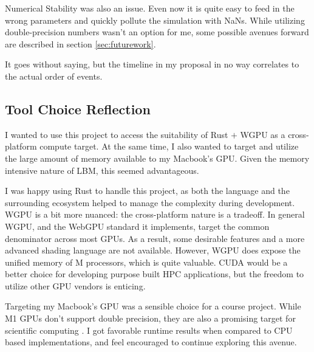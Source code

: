 Numerical Stability was also an issue.
Even now it is quite easy to feed in the wrong parameters
and quickly pollute the simulation with NaNs.
While utilizing double-precision numbers wasn't an option for me,
some possible avenues forward are described 
in section \ref{sec:futurework}.

It goes without saying, 
but the timeline in my proposal
in no way correlates to the actual order of events.

\subsection{Tool Choice Reflection}
I wanted to use this project to access the suitability of Rust $+$ WGPU 
as a cross-platform compute target.
At the same time, I also wanted to target and 
utilize the large amount of memory available to my Macbook's GPU.
Given the memory intensive nature of LBM, this seemed advantageous.

I was happy using Rust to handle this project, as both the 
language and the surrounding ecosystem helped to manage
the complexity during development.
WGPU is a bit more nuanced: the cross-platform nature
is a tradeoff. In general WGPU, 
and the WebGPU standard it implements,
target the common denominator across most GPUs.
As a result, some desirable features and a more advanced
shading language are not available.
However, WGPU does expose the unified memory of M processors,
which is quite valuable.
CUDA would be a better choice 
for developing purpose built HPC
applications, but the freedom to utilize other GPU vendors is enticing.

Targeting my Macbook's GPU was a sensible choice for a course project.
While M1 GPUs don't support double precision, 
they are also a promising target for scientific computing \cite{Kenyon2022}.
I got favorable runtime results when compared to CPU based implementations,
and feel encouraged to continue exploring this avenue.

